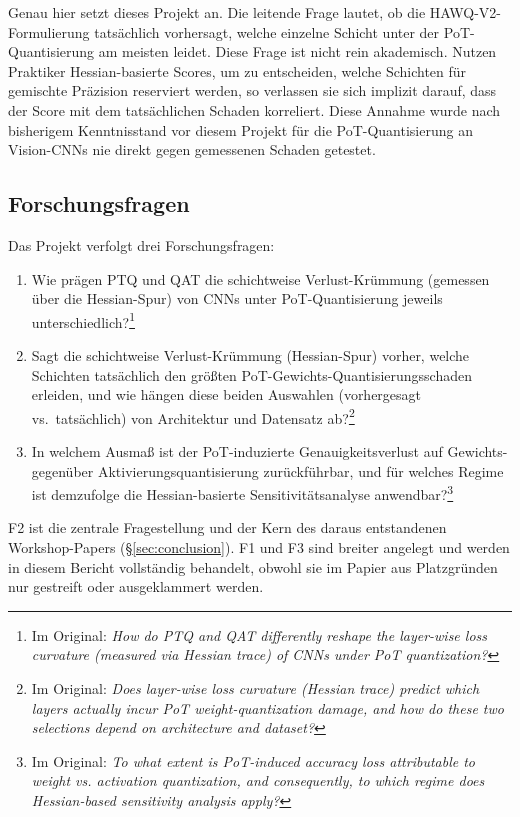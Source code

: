 Genau hier setzt dieses Projekt an. Die leitende Frage lautet, ob die HAWQ-V2-Formulierung tatsächlich vorhersagt, welche einzelne Schicht unter der PoT-Quantisierung am meisten leidet. Diese Frage ist nicht rein akademisch. Nutzen Praktiker Hessian-basierte Scores, um zu entscheiden, welche Schichten für gemischte Präzision reserviert werden, so verlassen sie sich implizit darauf, dass der Score mit dem tatsächlichen Schaden korreliert. Diese Annahme wurde nach bisherigem Kenntnisstand vor diesem Projekt für die PoT-Quantisierung an Vision-CNNs nie direkt gegen gemessenen Schaden getestet.

\subsection{Forschungsfragen}

Das Projekt verfolgt drei Forschungsfragen:

\begin{enumerate}
\item[\textbf{F1}] Wie prägen PTQ und QAT die schichtweise Verlust-Krümmung (gemessen über die Hessian-Spur) von CNNs unter PoT-Quantisierung jeweils unterschiedlich?\footnote{Im Original: \emph{How do PTQ and QAT differently reshape the layer-wise loss curvature (measured via Hessian trace) of CNNs under PoT quantization?}}
\item[\textbf{F2}] Sagt die schichtweise Verlust-Krümmung (Hessian-Spur) vorher, welche Schichten tatsächlich den größten PoT-Gewichts-Quantisierungsschaden erleiden, und wie hängen diese beiden Auswahlen (vorhergesagt vs.\ tatsächlich) von Architektur und Datensatz ab?\footnote{Im Original: \emph{Does layer-wise loss curvature (Hessian trace) predict which layers actually incur PoT weight-quantization damage, and how do these two selections depend on architecture and dataset?}}
\item[\textbf{F3}] In welchem Ausmaß ist der PoT-induzierte Genauigkeitsverlust auf Gewichts- gegenüber Aktivierungsquantisierung zurückführbar, und für welches Regime ist demzufolge die Hessian-basierte Sensitivitätsanalyse anwendbar?\footnote{Im Original: \emph{To what extent is PoT-induced accuracy loss attributable to weight vs. activation quantization, and consequently, to which regime does Hessian-based sensitivity analysis apply?}}
\end{enumerate}

F2 ist die zentrale Fragestellung und der Kern des daraus entstandenen Workshop-Papers (\S\ref{sec:conclusion}). F1 und F3 sind breiter angelegt und werden in diesem Bericht vollständig behandelt, obwohl sie im Papier aus Platzgründen nur gestreift oder ausgeklammert werden.

